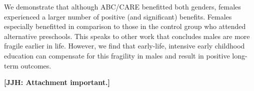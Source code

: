 We demonstrate that although ABC/CARE benefitted both genders, females experienced a larger number of positive (and significant) benefits. Females especially benefitted in comparison to those in the control group who attended alternative preschools. This speaks to other work that concludes males are more fragile earlier in life. However, we find that early-life, intensive early childhood education can compensate for this fragility in males and result in positive long-term outcomes. 

\textbf{[JJH: Attachment important.]}